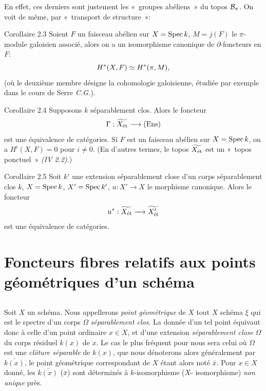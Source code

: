 \documentclass[10pt]{../fichiers-configuration-latex/smfart}
\begin{document}
En effet, ces derniers sont justement les « groupes abéliens »
du topos ${\mathcal B}_{\pi}$. On voit de même, par « transport de
structure »:

\begin{enonce*}{Corollaire 2.3}
Soient $F$ un faisceau abélien sur $X = \operatorname{Spec} k$, $M = j(F)$ le
$\pi$-module galoisien associé, alors on a un isomorphisme canonique
de $\partial$-foncteurs en $F$:
$$
H^{\ast} (X, F) \simeq H^{\ast} (\pi, M){},
$$
(où le deuxième membre désigne la cohomologie galoisienne,
étudiée par
exemple dans le cours de Serre \emph{C.G.}).
\end{enonce*}

\begin{enonce*}{Corollaire 2.4}
Supposons $k$ séparablement clos. Alors le foncteur
$$
\Gamma : \widetilde{X_{\text{\rm ét}}} \to (\Ens)
$$
est une équivalence de catégories. Si $F$ est un faisceau abélien sur
$X = \operatorname{Spec} k$, on a $H^{i}(X, F) = 0$ pour $i \neq 0$. (En d'autres
termes, le topos $\widetilde{X_{\text{\rm ét}}}$ est un « topos
ponctuel » \emph{(IV 2.2)}.)
\end{enonce*}

\begin{enonce*}{Corollaire 2.5}
Soit $k'$ une extension séparablement close d'un corps séparablement
clos $k$, $X = \operatorname{Spec} k$, $X' = \operatorname{Spec} k'$, $u : X'\to X$ le morphisme
canonique. Alors le foncteur
$$
u^{\ast} : \widetilde{X_{\text{\rm ét}}} \to \widetilde{X'_{\text{\rm ét}}}
$$
est une équivalence de catégories.
\end{enonce*}

\section{Foncteurs fibres relatifs aux points géométriques d'un
  schéma}\pageoriginale

\subsection{}

Soit $X$ un schéma. Nous appellerons \emph{point géométrique} de $X$
tout $X$ schéma $\xi$ qui est le spectre d'un corps $\Omega$
\emph{séparablement clos}. La donnée d'un tel point équivaut donc à
celle d'un point ordinaire $x \in X$, et d'une extension
\emph{séparablement close} $\Omega$ du corps résiduel $k(x)$ de $x$.
Le cas le plus fréquent pour nous sera celui où $\Omega$ est une
\emph{clôture séparable} de $k(x)$, que nous dénoterons alors
généralement par $\bar{k(x)}$, le point géométrique correspondant de
$X$ étant alors noté $\bar{x}$. Pour $x \in X$ donné, les
$\bar{k(x)}$ (\resp $\bar{x}$) sont déterminés à $k$-isomorphisme
(\resp $X$- isomorphisme) \emph{non unique} près.
\end{document}
